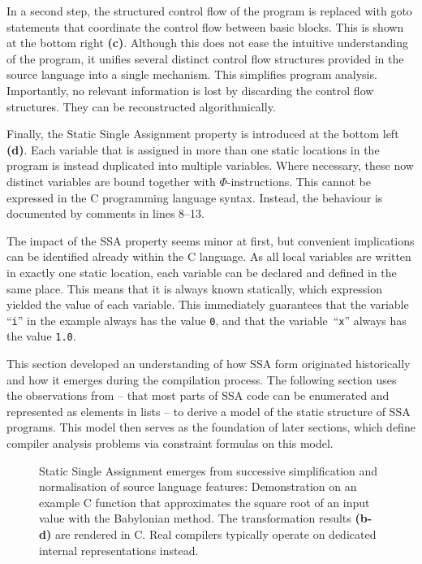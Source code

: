     In a second step, the structured control flow of the program is replaced
    with goto statements that coordinate the control flow between basic blocks.
    This is shown at the bottom right {\bf(c)}.
    Although this does not ease the intuitive understanding of the program, it
    unifies several distinct control flow structures provided in the source
    language into a single mechanism.
    This simplifies program analysis.
    Importantly, no relevant information is lost by discarding the control flow
    structures.
    They can be reconstructed algorithmically.

    Finally, the Static Single Assignment property is introduced at the bottom
    left {\bf(d)}.
    Each variable that is assigned in more than one static locations in the
    program is instead duplicated into multiple variables.
    Where necessary, these now distinct variables are bound together with
    $\Phi$-instructions.
    This cannot be expressed in the C programming language syntax.
    Instead, the behaviour is documented by comments in lines 8--13.

    The impact of the SSA property seems minor at first, but convenient
    implications can be identified already within the C language.
    As all local variables are written in exactly one static location, each
    variable can be declared and defined in the same place.
    This means that it is always known statically, which expression yielded the
    value of each variable.
    This immediately guarantees that the variable ``\texttt{i}'' in the example
    always has the value \texttt{0}, and that the variable~``\texttt{x}'' always
    has the value \texttt{1.0}.

    This section developed an understanding of how SSA form originated
    historically and how it emerges during the compilation process.
    The following section uses the observations from
     -- that most parts of SSA code can be enumerated
    and represented as elements in lists -- to derive a model of the static
    structure of SSA programs.
    This model then serves as the foundation of later sections, which define
    compiler analysis problems via constraint formulas on this model.

\begin{figure}[p]
    
    \caption{Static Single Assignment emerges from successive simplification
             and normalisation of source language features: 
             Demonstration on an example C function that approximates the
             square root of an input value with the Babylonian method.
             The transformation results {\bf (b-d)} are rendered in C.
             Real compilers typically operate on
             dedicated internal representations instead.}
    \label{ssaexample}
\end{figure}

